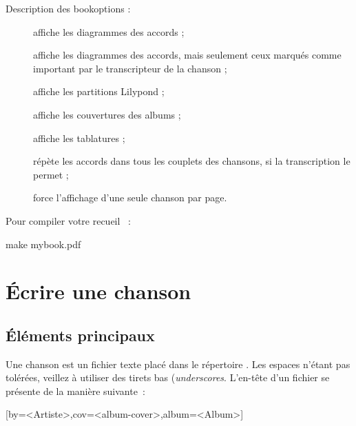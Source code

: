Description des \og bookoptions \fg{} :
\begin{description}
  \item[] affiche les diagrammes des accords ;
  \item[] affiche les diagrammes des
    accords, mais seulement ceux marqués comme important par le
    transcripteur de la chanson ;
  \item[] affiche les partitions Lilypond ;
  \item[] affiche les couvertures des albums ;
  \item[] affiche les tablatures ;
  \item[] répète les accords dans tous les
    couplets des chansons, si la transcription le permet ;
  \item[] force l'affichage d'une seule
    chanson par page.
\end{description}

Pour compiler votre recueil ~:
\begin{unix}
make mybook.pdf
\end{unix}


\section{Écrire une chanson}
\label{sec:write-song}

\subsection{Éléments principaux}

Une chanson est un fichier texte  placé dans
le répertoire . Les espaces n'étant pas
tolérées, veillez à utiliser des tirets bas (\emph{underscores}.
L'en-tête d'un fichier
 se présente de la manière suivante~:

\begin{song}
  [by=<Artiste>,cov=<album-cover>,album=<Album>]
\end{song}

